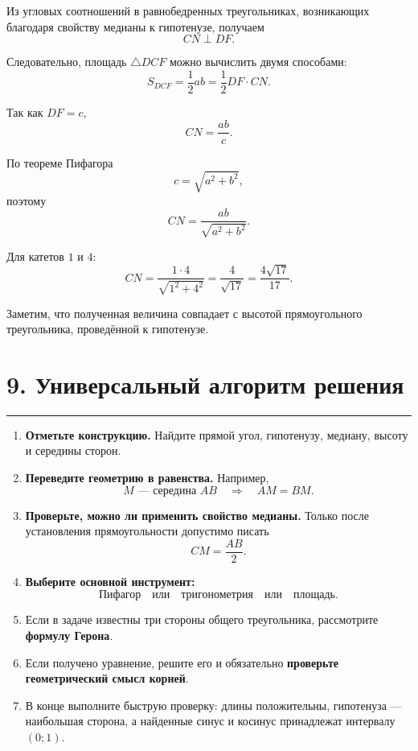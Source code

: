\documentclass[a4paper,12pt]{article}
\newcommand{\key}[1]{\textcolor{darkaccent}{\textbf{#1}}}
\newcommand{\sectionrule}{%
  \par\vspace{-0.35em}%
  {\color{accent!60}\rule{\linewidth}{0.7pt}}%
  \vspace{0.35em}
}
\begin{document}
Из угловых соотношений в равнобедренных треугольниках,
возникающих благодаря свойству медианы к гипотенузе,
получаем
\[
CN\perp DF.
\]

Следовательно, площадь \(\triangle DCF\) можно вычислить двумя способами:
\[
S_{DCF}
=
\frac12 ab
=
\frac12 DF\cdot CN.
\]

Так как \(DF=c\),
\[
\boxed{
CN=\frac{ab}{c}
}.
\]

По теореме Пифагора
\[
c=\sqrt{a^2+b^2},
\]
поэтому
\[
\boxed{
CN=\frac{ab}{\sqrt{a^2+b^2}}
}.
\]

Для катетов \(1\) и \(4\):
\[
CN=
\frac{1\cdot4}{\sqrt{1^2+4^2}}
=
\boxed{\frac{4}{\sqrt{17}}}
=
\boxed{\frac{4\sqrt{17}}{17}}.
\]

Заметим, что полученная величина совпадает с высотой прямоугольного
треугольника, проведённой к гипотенузе.

\section*{\textcolor{darkaccent}{9. Универсальный алгоритм решения}}
\sectionrule

\begin{enumerate}[label=\textbf{\arabic*.}]
  \item \key{Отметьте конструкцию.}
  Найдите прямой угол, гипотенузу, медиану, высоту и середины сторон.

  \item \key{Переведите геометрию в равенства.}
  Например,
  \[
  M\text{ --- середина }AB
  \quad\Longrightarrow\quad
  AM=BM.
  \]

  \item \key{Проверьте, можно ли применить свойство медианы.}
  Только после установления прямоугольности допустимо писать
  \[
  CM=\frac{AB}{2}.
  \]

  \item \key{Выберите основной инструмент:}
  \[
  \text{Пифагор}
  \quad\text{или}\quad
  \text{тригонометрия}
  \quad\text{или}\quad
  \text{площадь}.
  \]

  \item Если в задаче известны три стороны общего треугольника,
  рассмотрите \key{формулу Герона}.

  \item Если получено уравнение, решите его и обязательно
  \key{проверьте геометрический смысл корней}.

  \item В конце выполните быструю проверку:
  длины положительны, гипотенуза --- наибольшая сторона,
  а найденные синус и косинус принадлежат интервалу \((0;1)\).
\end{enumerate}
\end{document}
